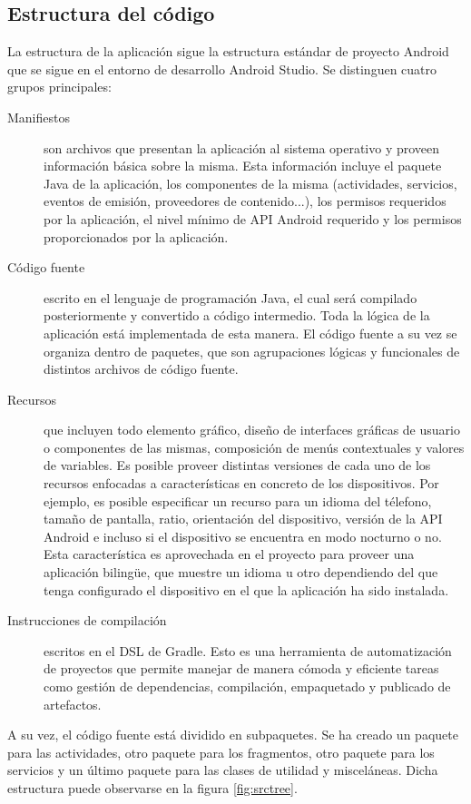\FloatBarrier
\subsection{Estructura del código}
\label{sec:estructura}
La estructura de la aplicación sigue la estructura estándar de proyecto Android que se sigue en el entorno de desarrollo Android Studio. Se distinguen cuatro grupos principales:
\begin{description}
\item[Manifiestos] son archivos que presentan la aplicación al sistema operativo y proveen información básica sobre la misma. Esta información incluye el paquete Java de la aplicación, los componentes de la misma (actividades, servicios, eventos de emisión, proveedores de contenido...), los permisos requeridos por la aplicación, el nivel mínimo de \ac{API} Android requerido y los permisos proporcionados por la aplicación.
\item[Código fuente] escrito en el lenguaje de programación Java, el cual será compilado posteriormente y convertido a código intermedio. Toda la lógica de la aplicación está implementada de esta manera. El código fuente a su vez se organiza dentro de paquetes, que son agrupaciones lógicas y funcionales de distintos archivos de código fuente.
\item[Recursos] que incluyen todo elemento gráfico, diseño de interfaces gráficas de usuario o componentes de las mismas, composición de menús contextuales y valores de variables. Es posible proveer distintas versiones de cada uno de los recursos enfocadas a características en concreto de los dispositivos. Por ejemplo, es posible especificar un recurso para un idioma del télefono, tamaño de pantalla, ratio, orientación del dispositivo, versión de la API Android e incluso si el dispositivo se encuentra en modo nocturno o no. Esta característica es aprovechada en el proyecto para proveer una aplicación bilingüe, que muestre un idioma u otro dependiendo del que tenga configurado el dispositivo en el que la aplicación ha sido instalada.
\item[Instrucciones de compilación] escritos en el \ac{DSL} de Gradle. Esto es una herramienta de automatización de proyectos que permite manejar de manera cómoda y eficiente tareas como gestión de dependencias, compilación, empaquetado y publicado de artefactos.
\end{description}
 
 A su vez, el código fuente está dividido en subpaquetes. Se ha creado un paquete para las actividades, otro paquete para los fragmentos, otro paquete para los servicios y un último paquete para las clases de utilidad y misceláneas. Dicha estructura puede observarse en la figura \ref{fig:srctree}.
 
